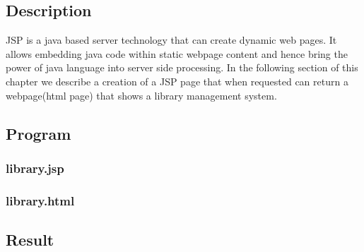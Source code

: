 \subsection{Description}
JSP is a java based server technology that can create dynamic web pages.
It allows embedding java code within static webpage content and hence bring the power of java language into server side processing.
In the following section of this chapter we describe a creation of a JSP page that when requested can return a webpage(html page) that shows a library management system.


\subsection{Program}
\subsubsection{library.jsp}
\subsubsection{library.html}


\subsection{Result}\result
